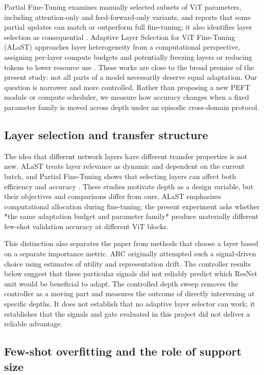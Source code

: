 \documentclass[11pt]{article}
\begin{document}
Partial Fine-Tuning examines manually selected subsets of ViT parameters, including attention-only and feed-forward-only variants, and reports that some partial updates can match or outperform full fine-tuning; it also identifies layer selection as consequential \cite{ye2023}. Adaptive Layer Selection for ViT Fine-Tuning (ALaST) approaches layer heterogeneity from a computational perspective, assigning per-layer compute budgets and potentially freezing layers or reducing tokens to lower resource use \cite{devoto2025}. These works are close to the broad premise of the present study: not all parts of a model necessarily deserve equal adaptation. Our question is narrower and more controlled. Rather than proposing a new PEFT module or compute scheduler, we measure how accuracy changes when a fixed parameter family is moved across depth under an episodic cross-domain protocol.

\subsection{Layer selection and transfer structure}

The idea that different network layers have different transfer properties is not new. ALaST treats layer relevance as dynamic and dependent on the current batch, and Partial Fine-Tuning shows that selecting layers can affect both efficiency and accuracy \cite{ye2023,devoto2025}. These studies motivate depth as a design variable, but their objectives and comparisons differ from ours. ALaST emphasizes computational allocation during fine-tuning; the present experiment asks whether *the same adaptation budget and parameter family* produce materially different few-shot validation accuracy at different ViT blocks.

This distinction also separates the paper from methods that choose a layer based on a separate importance metric. ARC originally attempted such a signal-driven choice using estimates of utility and representation drift. The controller results below suggest that these particular signals did not reliably predict which ResNet unit would be beneficial to adapt. The controlled depth sweep removes the controller as a moving part and measures the outcome of directly intervening at specific depths. It does not establish that no adaptive layer selector can work; it establishes that the signals and gate evaluated in this project did not deliver a reliable advantage.

\subsection{Few-shot overfitting and the role of support size}
\end{document}
